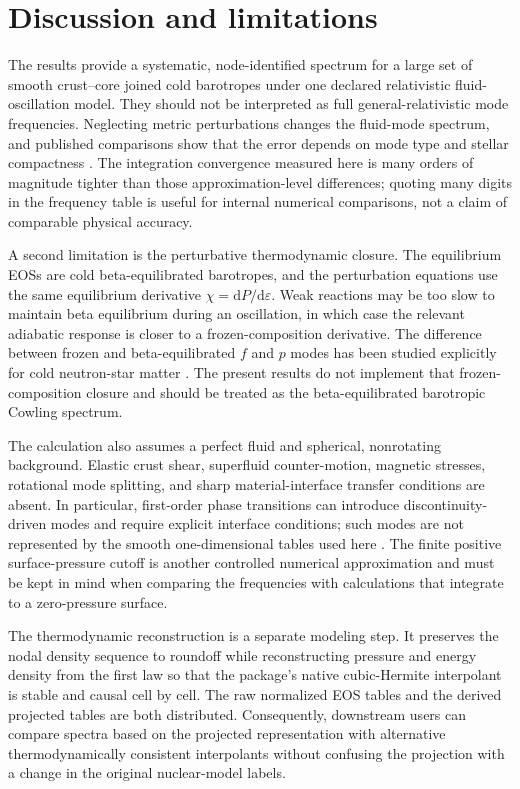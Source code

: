 \documentclass[aps,prd,twocolumn,superscriptaddress,nofootinbib]{revtex4-2}
\newcommand{\eps}{\varepsilon}
\newcommand{\dd}{\mathrm{d}}
\begin{document}
\section{Discussion and limitations}

The results provide a systematic, node-identified spectrum for a large set of smooth crust--core joined cold barotropes under one declared relativistic fluid-oscillation model. They should not be interpreted as full general-relativistic mode frequencies. Neglecting metric perturbations changes the fluid-mode spectrum, and published comparisons show that the error depends on mode type and stellar compactness \cite{YoshidaKojima1997,Kokkotas1996}. The integration convergence measured here is many orders of magnitude tighter than those approximation-level differences; quoting many digits in the frequency table is useful for internal numerical comparisons, not a claim of comparable physical accuracy.

A second limitation is the perturbative thermodynamic closure. The equilibrium EOSs are cold beta-equilibrated barotropes, and the perturbation equations use the same equilibrium derivative $\chi=\dd P/\dd\eps$. Weak reactions may be too slow to maintain beta equilibrium during an oscillation, in which case the relevant adiabatic response is closer to a frozen-composition derivative. The difference between frozen and beta-equilibrated $f$ and $p$ modes has been studied explicitly for cold neutron-star matter \cite{Montefusco2025}. The present results do not implement that frozen-composition closure and should be treated as the beta-equilibrated barotropic Cowling spectrum.

The calculation also assumes a perfect fluid and spherical, nonrotating background. Elastic crust shear, superfluid counter-motion, magnetic stresses, rotational mode splitting, and sharp material-interface transfer conditions are absent. In particular, first-order phase transitions can introduce discontinuity-driven modes and require explicit interface conditions; such modes are not represented by the smooth one-dimensional tables used here \cite{RaneaSandoval2018,TonettoLugones2020}. The finite positive surface-pressure cutoff is another controlled numerical approximation and must be kept in mind when comparing the frequencies with calculations that integrate to a zero-pressure surface.

The thermodynamic reconstruction is a separate modeling step. It preserves the nodal density sequence to roundoff while reconstructing pressure and energy density from the first law so that the package's native cubic-Hermite interpolant is stable and causal cell by cell. The raw normalized EOS tables and the derived projected tables are both distributed. Consequently, downstream users can compare spectra based on the projected representation with alternative thermodynamically consistent interpolants without confusing the projection with a change in the original nuclear-model labels.
\end{document}
